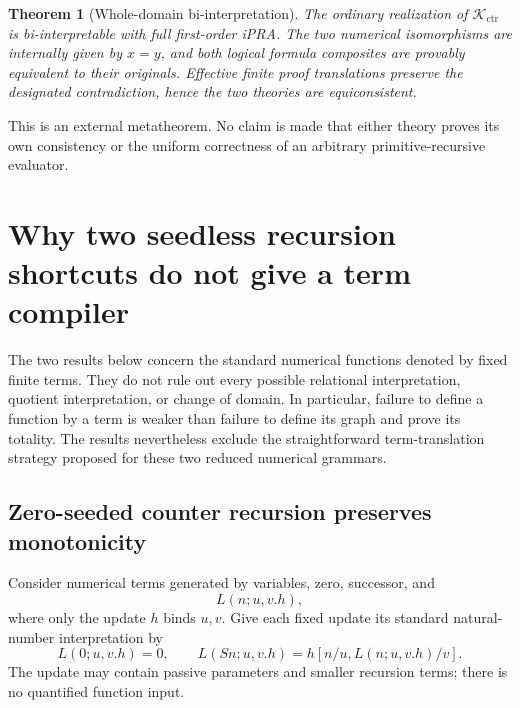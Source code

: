 \documentclass[11pt,letterpaper]{article}
\newtheorem{theorem}{Theorem}[section]
\theoremstyle{definition}\newtheorem{definition}[theorem]{Definition}
\theoremstyle{remark}\newtheorem{remark}[theorem]{Remark}
\newcommand{\Acal}{\mathcal K_{\mathrm{ctr}}}
\begin{document}
\begin{theorem}[Whole-domain bi-interpretation]
The ordinary realization of $\Acal$ is bi-interpretable with full
first-order iPRA. The two numerical isomorphisms are internally given
by $x=y$, and both logical formula composites are provably equivalent
to their originals. Effective finite proof translations preserve the
designated contradiction, hence the two theories are equiconsistent.
\end{theorem}
This is an external metatheorem. No claim is made that either theory
proves its own consistency or the uniform correctness of an arbitrary
primitive-recursive evaluator.




\section{Why two seedless recursion shortcuts do not give a term compiler}
\label{seedless:section}

The two results below concern the standard numerical functions denoted
by fixed finite terms. They do not rule out every possible relational
interpretation, quotient interpretation, or change of domain. In
particular, failure to define a function by a term is weaker than failure
to define its graph and prove its totality. The results nevertheless
exclude the straightforward term-translation strategy proposed for
these two reduced numerical grammars.

\subsection{Zero-seeded counter recursion preserves monotonicity}

Consider numerical terms generated by variables, zero, successor, and
\[
                  L(n;u,v.h),
\]
where only the update $h$ binds $u,v$. Give each fixed update its standard
natural-number interpretation by
\[
 L(0;u,v.h)=0,\qquad
 L(Sn;u,v.h)=h[n/u,L(n;u,v.h)/v].
 \tag{Zero-seeded recursion}
\]
The update may contain passive parameters and smaller recursion terms;
there is no quantified function input.
\end{document}
